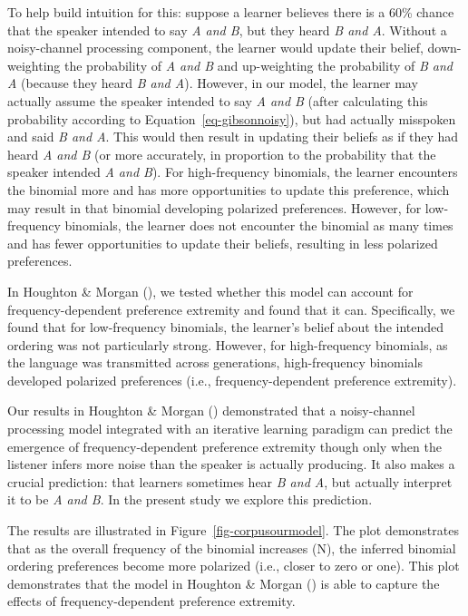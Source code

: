 \documentclass[
  12pt,
]{scrartcl}
\begin{document}
To help build intuition for this: suppose a learner believes there is a
60\% chance that the speaker intended to say \emph{A and B}, but they
heard \emph{B and A}. Without a noisy-channel processing component, the
learner would update their belief, down-weighting the probability of
\emph{A and B} and up-weighting the probability of \emph{B and A}
(because they heard \emph{B and A}). However, in our model, the learner
may actually assume the speaker intended to say \emph{A and B} (after
calculating this probability according to
Equation~\ref{eq-gibsonnoisy}), but had actually misspoken and said
\emph{B and A}. This would then result in updating their beliefs as if
they had heard \emph{A and B} (or more accurately, in proportion to the
probability that the speaker intended \emph{A and B}). For
high-frequency binomials, the learner encounters the binomial more and
has more opportunities to update this preference, which may result in
that binomial developing polarized preferences. However, for
low-frequency binomials, the learner does not encounter the binomial as
many times and has fewer opportunities to update their beliefs,
resulting in less polarized preferences.

In Houghton \& Morgan
(),
we tested whether this model can account for frequency-dependent
preference extremity and found that it can. Specifically, we found that
for low-frequency binomials, the learner's belief about the intended
ordering was not particularly strong. However, for high-frequency
binomials, as the language was transmitted across generations,
high-frequency binomials developed polarized preferences (i.e.,
frequency-dependent preference extremity).

Our results in Houghton \& Morgan
()
demonstrated that a noisy-channel processing model integrated with an
iterative learning paradigm can predict the emergence of
frequency-dependent preference extremity though only when the listener
infers more noise than the speaker is actually producing. It also makes
a crucial prediction: that learners sometimes hear \emph{B and A}, but
actually interpret it to be \emph{A and B}. In the present study we
explore this prediction.

The results are illustrated in Figure~\ref{fig-corpusourmodel}. The plot
demonstrates that as the overall frequency of the binomial increases
(N), the inferred binomial ordering preferences become more polarized
(i.e., closer to zero or one). This plot demonstrates that the model in
Houghton \& Morgan
()
is able to capture the effects of frequency-dependent preference
extremity.
\end{document}
